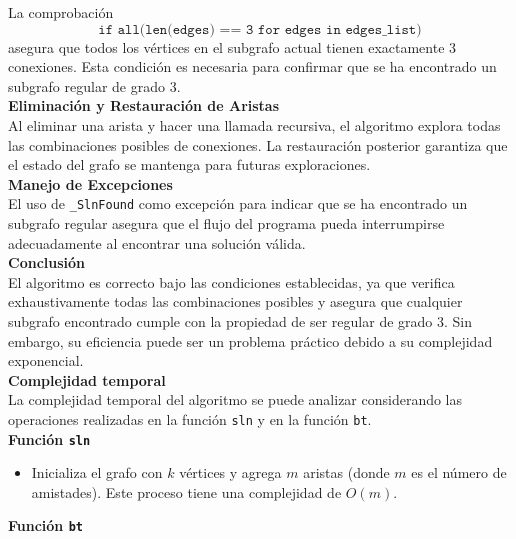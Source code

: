 \documentclass[
10pt, %
a4paper, %
oneside, %
headinclude,footinclude, %
BCOR5mm, %
]{scrartcl}
\begin{document}
La comprobación 
\[
\texttt{if all(len(edges) == 3 for edges in edges\_list)}
\]
asegura que todos los vértices en el subgrafo actual tienen exactamente 3 conexiones. Esta condición es necesaria para confirmar que se ha encontrado un subgrafo regular de grado 3.\\

\textbf{Eliminación y Restauración de Aristas} \\

Al eliminar una arista y hacer una llamada recursiva, el algoritmo explora todas las combinaciones posibles de conexiones. La restauración posterior garantiza que el estado del grafo se mantenga para futuras exploraciones.\\

\textbf{Manejo de Excepciones}\\

El uso de \texttt{\_SlnFound} como excepción para indicar que se ha encontrado un subgrafo regular asegura que el flujo del programa pueda interrumpirse adecuadamente al encontrar una solución válida.\\


\textbf{Conclusión}\\

El algoritmo es correcto bajo las condiciones establecidas, ya que verifica exhaustivamente todas las combinaciones posibles y asegura que cualquier subgrafo encontrado cumple con la propiedad de ser regular de grado 3. Sin embargo, su eficiencia puede ser un problema práctico debido a su complejidad exponencial.\\



\textbf{Complejidad temporal}\\


La complejidad temporal del algoritmo se puede analizar considerando las operaciones realizadas en la función \texttt{sln} y en la función \texttt{bt}.\\


\textbf{Función \texttt{sln} }\\

\begin{itemize}
    \item Inicializa el grafo con \( k \) vértices y agrega \( m \) aristas (donde \( m \) es el número de amistades). Este proceso tiene una complejidad de \( O(m) \).\\
\end{itemize}

\textbf{Función \texttt{bt} }\\
\end{document}
